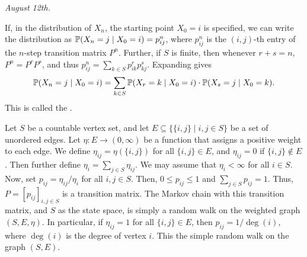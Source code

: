 \noindent \textit{August 12th.}

If, in the distribution of $X_{n}$, the starting point $X_{0} = i$ is specified, we can write the distribution as $\mathbb{P}(X_{n}=j \mid X_{0}=i) = p_{ij}^{n}$, where $p_{ij}^{n}$ is the $(i,j)$-th entry of the $n$-step transition matrix $P^{n}$. Further, if $S$ is finite, then whenever $r+s = n$, $P^{n} = P^{r}P^{s}$, and thus $p_{ij}^{n} = \sum_{k \in S} p_{ik}^{r}p_{kj}^{s}$. Expanding gives
\begin{align}
    \mathbb{P}(X_{n} = j \mid X_{0} = i) = \sum_{k \in S} \mathbb{P}(X_{r} = k \mid X_{0} = i) \cdot \mathbb{P}(X_{s} = j \mid X_{0} = k).
\end{align}
This is called the .

\begin{example}
    Let $S$ be a countable vertex set, and let $E \subseteq \{\{i,j\} \mid i,j \in S\}$ be a set of unordered edges. Let $\eta:E \to (0,\infty)$ be a function that assigns a positive weight to each edge. We define $\eta_{ij} = \eta(\{i,j\})$ for all $\{i,j\} \in E$, and $\eta_{ij} = 0$ if $\{i,j\} \notin E$. Then further define $\eta_{i} = \sum_{j \in S} \eta_{ij}$. We may assume that $\eta_{i} < \infty$ for all $i \in S$. Now, set $p_{ij} = \eta_{ij}/\eta_{i}$ for all $i,j \in S$. Then, $0 \leq p_{ij} \leq 1$ and $\sum_{j \in S} p_{ij} = 1$. Thus, $P = [p_{ij}]_{i,j \in S}$ is a transition matrix. The Markov chain with this transition matrix, and $S$ as the state space, is simply a random walk on the weighted graph $(S,E,\eta)$. In particular, if $\eta_{ij} = 1$ for all $\{i,j\} \in E$, then $p_{ij} = 1/\deg(i)$, where $\deg(i)$ is the degree of vertex $i$. This the simple random walk on the graph $(S,E)$.
\end{example}

